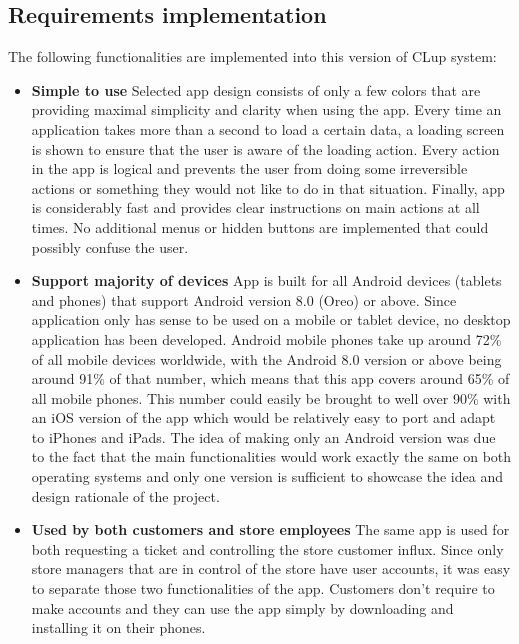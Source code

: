 \subsection{Requirements implementation}

\hspace{\parindent}The following functionalities are implemented into this version of CLup system:
\begin{itemize}
\item \textbf{Simple to use} \newline
\hspace{\parindent} Selected app design consists of only a few colors that are providing maximal simplicity and clarity when using the app. Every time an application takes more than a second to load a certain data, a loading screen is shown to ensure that the user is aware of the loading action. Every action in the app is logical and prevents the user from doing some irreversible actions or something they would not like to do in that situation. Finally, app is considerably fast and provides clear instructions on main actions at all times. No additional menus or hidden buttons are implemented that could possibly confuse the user.

\item \textbf{Support majority of devices} \newline
\hspace{\parindent} App is built for all Android devices (tablets and phones) that support Android version 8.0 (Oreo) or above. Since application only has sense to be used on a mobile or tablet device, no desktop application has been developed. Android mobile phones take up around 72\% of all mobile devices worldwide, with the Android 8.0 version or above being around 91\% of that number, which means that this app covers around 65\% of all mobile phones. This number could easily be brought to  well over 90\% with an iOS version of the app which would be relatively easy to port and adapt to iPhones and iPads. The idea of making only an Android version was due to the fact that the main functionalities would work exactly the same on both operating systems and only one version is sufficient to showcase the idea and design rationale of the project. 

\item \textbf{Used by both customers and store employees } \newline
\hspace{\parindent} The same app is used for both requesting a ticket and controlling the store customer influx. Since only store managers that are in control of the store have user accounts, it was easy to separate those two functionalities of the app. Customers don't require to make accounts and they can use the app simply by downloading and installing it on their phones.


\end{itemize}
